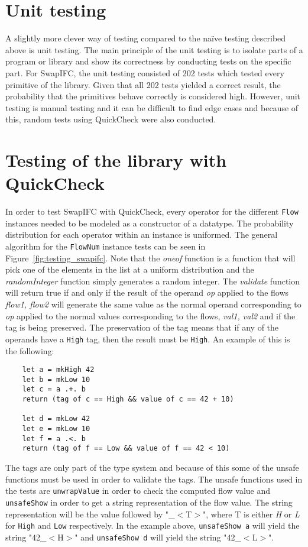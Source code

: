 \section{Unit testing}
A slightly more clever way of testing compared to the naïve testing described above is unit testing. The main principle of the unit testing is to isolate parts of a program or library and show its correctness by conducting tests on the specific part. For SwapIFC, the unit testing consisted of 202 tests which tested every primitive of the library. Given that all 202 tests yielded a correct result, the probability that the primitives behave correctly is considered high. However, unit testing is manual testing and it can be difficult to find edge cases and because of this, random tests using QuickCheck were also conducted.

\section{Testing of the library with QuickCheck}
In order to test SwapIFC with QuickCheck, every operator for the different {\tt Flow} instances needed to be modeled as a constructor of a datatype. The probability distribution for each operator within an instance is uniformed. The general algorithm for the {\tt FlowNum} instance tests can be seen in Figure~\ref{fig:testing_swapifc}. Note that the \emph{oneof} function is a function that will pick one of the elements in the list at a uniform distribution and the \emph{randomInteger} function simply generates a random integer. The \emph{validate} function will return true if and only if the result of the operand \emph{op} applied to the flows \emph{flow1, flow2} will generate the same value as the normal operand corresponding to \emph{op} applied to the normal values corresponding to the flows, \emph{val1, val2} and if the tag is being preserved. The preservation of the tag means that if any of the operands have a {\tt High} tag, then the result must be {\tt High}. An example of this is the following:
\begin{verbatim}
    let a = mkHigh 42
    let b = mkLow 10
    let c = a .+. b
    return (tag of c == High && value of c == 42 + 10)

    let d = mkLow 42
    let e = mkLow 10
    let f = a .<. b
    return (tag of f == Low && value of f == 42 < 10)
\end{verbatim}

The tags are only part of the type system and because of this some of the unsafe functions must be used in order to validate the tags. The unsafe functions used in the tests are {\tt unwrapValue} in order to check the computed flow value and {\tt unsafeShow} in order to get a string representation of the flow value. The string representation will be the value followed by "\_$<$T$>$", where T is either \emph{H} or \emph{L} for {\tt High} and {\tt Low} respectively. In the example above, {\tt unsafeShow a} will yield the string "42\_$<$H$>$" and {\tt unsafeShow d} will yield the string "42\_$<$L$>$".

